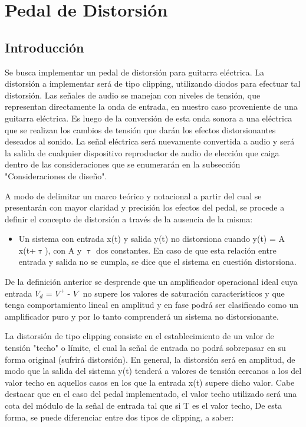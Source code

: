 \documentclass[../../main.tex]{subfiles}
\begin{document}
\section{Pedal de Distorsión}

\subsection{Introducción}

Se busca implementar un pedal de distorsión para guitarra eléctrica. La distorsión a implementar ser\'a de tipo clipping, utilizando diodos para efectuar tal distorsión.
Las señales de audio se manejan con niveles de tensión, que representan directamente la onda de entrada, en nuestro caso proveniente de una guitarra eléctrica. Es luego de la conversión de esta onda sonora a una eléctrica que se realizan los cambios de tensión que darán los efectos distorsionantes deseados al sonido.  La señal eléctrica ser\'a nuevamente convertida a audio y ser\'a la salida de cualquier dispositivo reproductor de audio de elección que caiga dentro de las consideraciones que se enumerarán en la subsección "Consideraciones de dise\~no".  	\par
{}

A modo de delimitar un marco teórico y notacional a partir del cual se presentarán con mayor claridad y precisión los efectos del pedal, se procede a definir el concepto de distorsión a través de la ausencia de la misma: \par

\begin{itemize}
	\item Un sistema con entrada x(t) y salida y(t) no distorsiona cuando y(t) = A x(t+{$\uptau$}), con A y {$\uptau$} dos constantes.  En caso de que esta relación entre entrada y salida no se cumpla, se dice que el sistema en cuestión distorsiona.\par
\end{itemize}

De la definición anterior se desprende que un amplificador operacional ideal cuya entrada $V_d$ = $V^{\text{+}}$ - $V^{\text{-}}$ no supere los valores de saturación característicos y que tenga comportamiento lineal en amplitud y en fase podrá ser clasificado como un amplificador puro y por lo tanto comprenderá un sistema no distorsionante. \par
La distorsión de tipo clipping consiste en el establecimiento de un valor de tensión "techo" o límite, el cual la señal de entrada no podrá sobrepasar en su forma original (sufrirá distorsión). En general, la distorsión será en amplitud, de modo que la salida del sistema y(t) tenderá a valores de tensión cercanos a los del valor techo en aquellos casos en los que la entrada x(t) supere dicho valor. Cabe destacar que en el caso del pedal implementado, el valor techo utilizado será una cota del módulo de la señal de entrada tal que si T es el valor techo, 
De esta forma,  se puede diferenciar entre dos tipos de clipping, a saber:  \par
\end{document}

